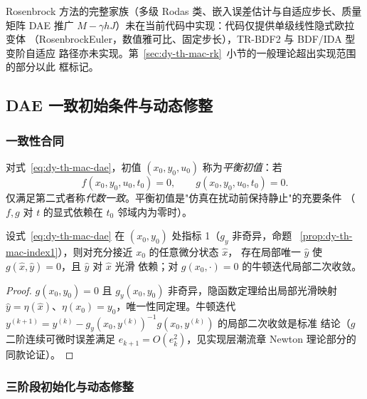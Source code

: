 \begin{gapnote}
Rosenbrock 方法的完整家族（多级 Rodas 类、嵌入误差估计与自适应步长、质量矩阵
DAE 推广 $M-\gamma hJ$）未在当前代码中实现：代码仅提供单级线性隐式欧拉变体
（RosenbrockEuler，数值雅可比、固定步长），TR-BDF2 与 BDF/IDA 型变阶自适应
路径亦未实现。第~\ref{sec:dy-th-mac-rk}~小节的一般理论超出实现范围的部分以此
框标记。
\end{gapnote}

\subsection{DAE 一致初始条件与动态修整}\label{sec:dy-th-mac-init}

\subsubsection{一致性合同}

\begin{definition}[平衡初值与一致初始条件]\label{def:dy-th-mac-consistent}
对式~\eqref{eq:dy-th-mac-dae}，初值 $(x_0,y_0,u_0)$ 称为\emph{平衡初值}：若
\begin{equation}
f(x_0,y_0,u_0,t_0)=0,\qquad g(x_0,y_0,u_0,t_0)=0 .
\label{eq:dy-th-mac-equil}
\end{equation}
仅满足第二式者称\emph{代数一致}。平衡初值是"仿真在扰动前保持静止"的充要条件
（$f,g$ 对 $t$ 的显式依赖在 $t_0$ 邻域内为零时）。
\end{definition}

\begin{proposition}[指标 1 下一致性的适定性]\label{prop:dy-th-mac-initwellposed}
设式~\eqref{eq:dy-th-mac-dae} 在 $(x_0,y_0)$ 处指标 1（$g_y$ 非奇异，命题
~\ref{prop:dy-th-mac-index1}），则对充分接近 $x_0$ 的任意微分状态 $\hat x$，
存在局部唯一 $\hat y$ 使 $g(\hat x,\hat y)=0$，且 $\hat y$ 对 $\hat x$ 光滑
依赖；对 $g(x_0,\cdot)=0$ 的牛顿迭代局部二次收敛。
\end{proposition}

\begin{proof}
$g(x_0,y_0)=0$ 且 $g_y(x_0,y_0)$ 非奇异，隐函数定理给出局部光滑映射
$\hat y=\eta(\hat x)$、$\eta(x_0)=y_0$，唯一性同定理。牛顿迭代
$y^{(k+1)}=y^{(k)}-g_y(x_0,y^{(k)})^{-1}g(x_0,y^{(k)})$ 的局部二次收敛是标准
结论（$g$ 二阶连续可微时误差满足 $e_{k+1}=O(e_k^2)$，见实现层潮流章 Newton
理论部分的同款论证）。
\end{proof}

\subsubsection{三阶段初始化与动态修整}

